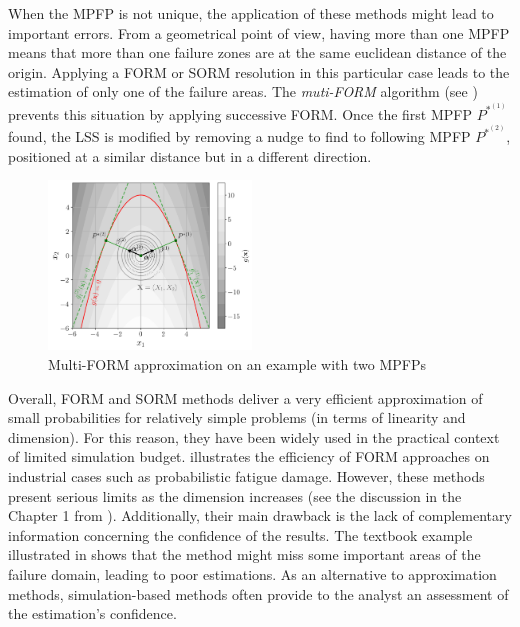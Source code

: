 When the MPFP is not unique, the application of these methods might lead to important errors. 
From a geometrical point of view, having more than one MPFP means that more than one failure zones are at the same euclidean distance of the origin. 
Applying a FORM or SORM resolution in this particular case leads to the estimation of only one of the failure areas. 
The \textit{muti-FORM} algorithm (see \citet{derkiureghian_1998}) prevents this situation by applying successive FORM. 
Once the first MPFP $P^{*^{(1)}}$ found, the LSS is modified by removing a nudge to find to following MPFP $P^{*^{(2)}}$, positioned at a similar distance but in a different direction. 

\begin{figure}[ht]
    \centering
    \includegraphics[width=0.48\textwidth]{../numerical_experiments/chapter1/figures/reliability_multiform.png}
    \caption{Multi-FORM approximation on an example with two MPFPs}
    \label{fig:multi_FORM}
\end{figure}


Overall, FORM and SORM methods deliver a very efficient approximation of small probabilities for relatively simple problems (in terms of linearity and dimension). 
For this reason, they have been widely used in the practical context of limited simulation budget. 
\citet{straub_2014_fatigue_form} illustrates the efficiency of FORM approaches on industrial cases such as probabilistic fatigue damage. 
However, these methods present serious limits as the dimension increases (see the discussion in the Chapter 1 from \citealt{chabridon_2018_thesis}). 
Additionally, their main drawback is the lack of complementary information concerning the confidence of the results. 
The textbook example illustrated in  shows that the method might miss some important areas of the failure domain, leading to poor estimations. 
As an alternative to approximation methods, simulation-based methods often provide to the analyst an assessment of the estimation's confidence. 


